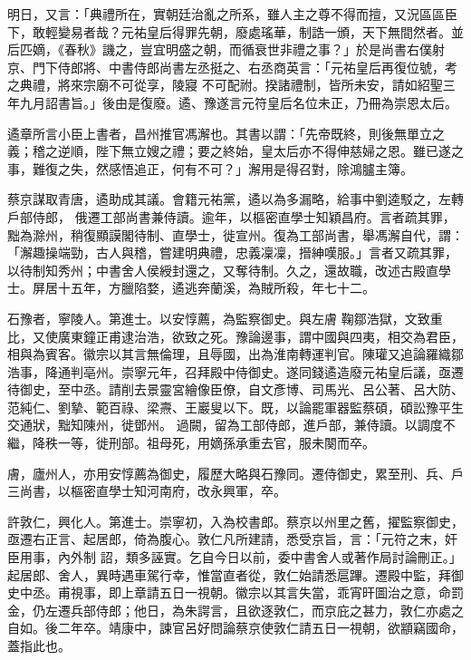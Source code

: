 \begin{pinyinscope}
 明日，又言：「典禮所在，實朝廷治亂之所系，雖人主之尊不得而擅，又況區區臣下，敢輕變易者哉？元祐皇后得罪先朝，廢處瑤華，制誥一頒，天下無間然者。並后匹嫡，《春秋》譏之，豈宜明盛之朝，而循衰世非禮之事？」於是尚書右僕射京、門下侍郎將、中書侍郎尚書左丞挺之、右丞商英言：「元祐皇后再復位號，考之典禮，將來宗廟不可從享，陵寢
 不可配祔。揆諸禮制，皆所未安，請如紹聖三年九月詔書旨。」後由是復廢。遹、豫遂言元符皇后名位未正，乃冊為崇恩太后。



 遹章所言小臣上書者，昌州推官馮澥也。其書以謂：「先帝既終，則後無單立之義；稽之逆順，陛下無立嫂之禮；要之終始，皇太后亦不得伸慈婦之恩。雖已遂之事，難復之失，然感悟追正，何有不可？」澥用是得召對，除鴻臚主簿。



 蔡京謀取青唐，遹助成其議。會籍元祐黨，遹以為多漏略，給事中劉逵駁之，左轉戶部侍郎，
 俄遷工部尚書兼侍讀。逾年，以樞密直學士知穎昌府。言者疏其罪，黜為滁州，稍復顯謨閣待制、直學士，徙宣州。復為工部尚書，舉馮澥自代，謂：「澥趣操端勁，古人與稽，嘗建明典禮，忠義凜凜，搢紳嘆服。」言者又疏其罪，以待制知秀州；中書舍人侯綬封還之，又奪待制。久之，還故職，改述古殿直學士。屏居十五年，方臘陷婺，遹逃奔蘭溪，為賊所殺，年七十二。



 石豫者，寧陵人。第進士。以安惇薦，為監察御史。與左膚
 鞠鄒浩獄，文致重比，又使廣東鐘正甫逮治浩，欲致之死。豫論邊事，謂中國與四夷，相交為君臣，相與為賓客。徽宗以其言無倫理，且辱國，出為淮南轉運判官。陳瓘又追論羅織鄒浩事，降通判亳州。崇寧元年，召拜殿中侍御史。遂同錢遹造廢元祐皇后議，亟遷待御史，至中丞。請削去景靈宮繪像臣僚，自文彥博、司馬光、呂公著、呂大防、范純仁、劉摯、範百祿、梁燾、王巖叟以下。既，以論罷軍器監蔡碩，碩訟豫平生交通狀，黜知陳州，徙鄧州。
 過闕，留為工部侍郎，進戶部，兼侍讀。以調度不繼，降秩一等，徙刑部。祖母死，用嫡孫承重去官，服未闋而卒。



 膚，廬州人，亦用安惇薦為御史，履歷大略與石豫同。遷侍御史，累至刑、兵、戶三尚書，以樞密直學士知河南府，改永興軍，卒。



 許敦仁，興化人。第進士。崇寧初，入為校書郎。蔡京以州里之舊，擢監察御史，亟遷右正言、起居郎，倚為腹心。敦仁凡所建請，悉受京旨，言：「元符之末，奸臣用事，內外制
 詔，類多誣實。乞自今日以前，委中書舍人或著作局討論刪正。」起居郎、舍人，異時遇車駕行幸，惟當直者從，敦仁始請悉扈蹕。遷殿中監，拜御史中丞。甫視事，即上章請五日一視朝。徽宗以其言失當，乖宵旰圖治之意，命罰金，仍左遷兵部侍郎；他日，為朱諤言，且欲逐敦仁，而京庇之甚力，敦仁亦處之自如。後二年卒。靖康中，諫官呂好問論蔡京使敦仁請五日一視朝，欲顓竊國命，蓋指此也。




\end{pinyinscope}

